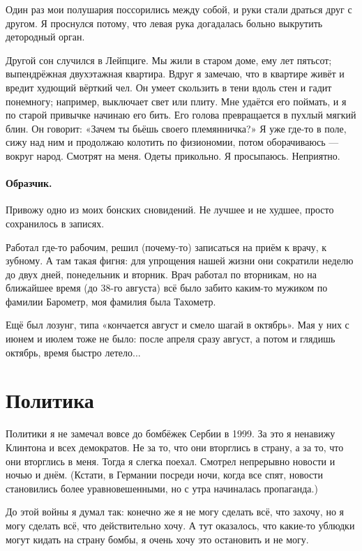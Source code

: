 \documentclass{book}
\begin{document}
Один раз мои полушария поссорились между собой, и руки стали драться друг с другом.
Я проснулся потому, что левая рука догадалась больно выкрутить детородный орган.

Другой сон случился в Лейпциге.
Мы жили в старом доме, ему лет пятьсот;
выпендрёжная двухэтажная квартира.
Вдруг я замечаю, что в квартире живёт и вредит худющий вёрткий чел.
Он умеет скользить в тени вдоль стен и гадит понемногу; например, выключает свет или плиту.
Мне удаётся его поймать, и я по старой привычке начинаю его бить.
Его голова превращается в пухлый мягкий блин.
Он говорит: «Зачем ты бьёшь своего племянничка?»
Я уже где-то в поле, сижу над ним и продолжаю колотить по физиономии, потом оборачиваюсь --- вокруг народ. 
Смотрят на меня.
Одеты прикольно. 
Я просыпаюсь.
Неприятно.

\paragraph{Образчик.}
Привожу одно из моих бонских сновидений.
Не лучшее и не худшее, просто сохранилось в записях.

Работал где-то рабочим, решил (почему-то) записаться на приём к врачу, к зубному.
А там такая фигня: для упрощения нашей жизни они сократили неделю до двух дней, понедельник и вторник. 
Врач работал по вторникам, но на ближайшее время (до 38-го августа) всё было забито каким-то мужиком по фамилии Барометр, моя фамилия была Тахометр.

Ещё был лозунг, типа «кончается август и смело шагай в октябрь».
Мая у них с июнем и июлем тоже не было: после апреля сразу август, а потом и глядишь октябрь, время быстро летело...

\section*{Политика}

Политики я не замечал вовсе до бомбёжек Сербии в 1999.
За это я ненавижу Клинтона и всех демократов.
Не за то, что они вторглись в страну, а за то, что они вторглись в меня.
Тогда я слегка поехал.
Смотрел непрерывно новости и ночью и днём.
(Кстати, в Германии посреди ночи, когда все спят, новости становились более уравновешенными, но с утра начиналась пропаганда.)

До этой войны я думал так: конечно же я не могу сделать всё, что захочу, но я могу сделать всё, что действительно хочу.
А тут оказалось, что какие-то ублюдки могут кидать на страну бомбы, я очень хочу это остановить и не могу.
\end{document}
